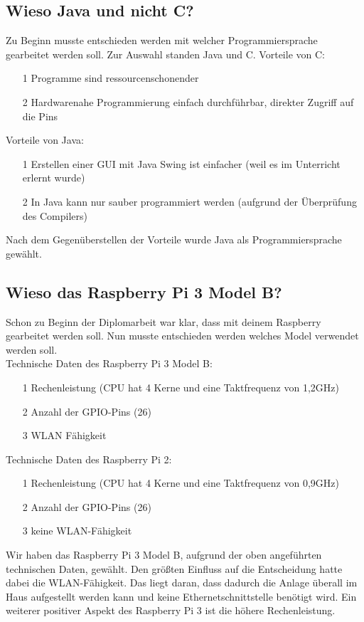 \subsection{Wieso Java und nicht C?}
Zu Beginn musste entschieden werden mit welcher Programmiersprache gearbeitet werden soll. Zur Auswahl standen Java und C.
Vorteile von C:
\begin{itemize}
\item[1] Programme sind ressourcenschonender
\item[2] Hardwarenahe Programmierung einfach durchführbar, direkter Zugriff auf die Pins
\end{itemize}
Vorteile von Java:
\begin{itemize}
\item[1] Erstellen einer \ac{GUI} mit Java Swing ist einfacher (weil es im Unterricht erlernt wurde)
\item[2] In Java kann nur sauber programmiert werden (aufgrund der Überprüfung des Compilers)
\end{itemize}

Nach dem Gegenüberstellen der Vorteile wurde Java als Programmiersprache gewählt.

\subsection{Wieso das Raspberry Pi 3 Model B?}
Schon zu Beginn der Diplomarbeit war klar, dass mit deinem Raspberry gearbeitet werden soll. Nun musste entschieden werden welches Model verwendet werden soll.
\\ Technische Daten des Raspberry Pi 3 Model B:
\begin{itemize}
\item[1] Rechenleistung (CPU hat 4 Kerne und eine Taktfrequenz von 1,2GHz)
\item[2] Anzahl der \ac{GPIO}-Pins (26)
\item[3] \ac{WLAN} Fähigkeit
\end{itemize}

Technische Daten des Raspberry Pi 2:
\begin{itemize}
\item[1] Rechenleistung (CPU hat 4 Kerne und eine Taktfrequenz von 0,9GHz)
\item[2] Anzahl der \ac{GPIO}-Pins (26)
\item[3] keine \ac{WLAN}-Fähigkeit
\end{itemize}

Wir haben das Raspberry Pi 3 Model B, aufgrund der oben angeführten technischen Daten, gewählt. Den größten Einfluss auf die Entscheidung hatte dabei die \ac{WLAN}-Fähigkeit. Das liegt daran, dass dadurch die Anlage überall im Haus aufgestellt werden kann und keine Ethernetschnittstelle benötigt wird. Ein weiterer positiver Aspekt des Raspberry Pi 3 ist die höhere Rechenleistung.

